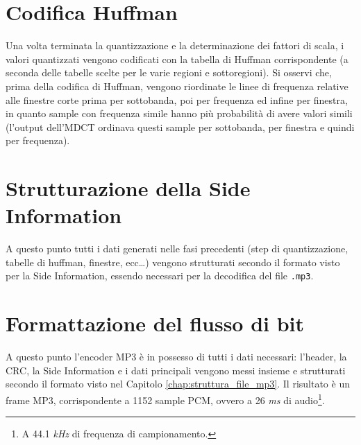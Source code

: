 	\section{Codifica Huffman} \label{sec:codifica_huffman}
		
		Una volta terminata la quantizzazione e la determinazione dei fattori di scala, i valori quantizzati vengono codificati con la tabella di Huffman corrispondente (a seconda delle tabelle scelte per le varie regioni e sottoregioni). Si osservi che, prima della codifica di Huffman, vengono riordinate le linee di frequenza relative alle finestre corte prima per sottobanda, poi per frequenza ed infine per finestra, in quanto sample con frequenza simile hanno più probabilità di avere valori simili (l'output dell'MDCT ordinava questi sample per sottobanda, per finestra e quindi per frequenza).
		
	\section{Strutturazione della Side Information} \label{sec:strutturazione_side_information}
		
		A questo punto tutti i dati generati nelle fasi precedenti (step di quantizzazione, tabelle di huffman, finestre, ecc\dots) vengono strutturati secondo il formato visto per la Side Information, essendo necessari per la decodifica del file \texttt{.mp3}.
		
	\section{Formattazione del flusso di bit} \label{sec:formattazione_flusso_bit}
		
		A questo punto l'encoder MP3 è in possesso di tutti i dati necessari: l'header, la CRC, la Side Information e i dati principali vengono messi insieme e strutturati secondo il formato visto nel Capitolo \ref{chap:struttura_file_mp3}. Il risultato è un frame MP3, corrispondente a 1152 sample PCM, ovvero a 26 \textit{ms} di audio\footnote{A 44.1 \textit{kHz} di frequenza di campionamento.}.
		